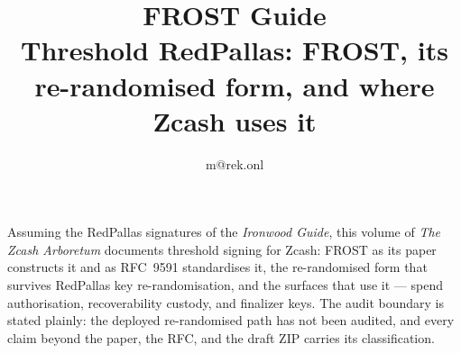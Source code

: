 \documentclass[11pt,a4paper]{article}
\title{\textbf{\Huge FROST Guide}\\[6pt]\large Threshold RedPallas: FROST, its re-randomised form, and where Zcash uses it}
\author{m@rek.onl}
\date{}
\theoremstyle{definition}
\renewenvironment{abstract}{%
  \small\begin{center}{\bfseries\abstractname}\end{center}\medskip\noindent\ignorespaces
}{\par\medskip}
\begin{document}
\maketitle
\thispagestyle{empty}
\begin{abstract}
Assuming the RedPallas signatures of the \emph{Ironwood Guide}, this volume
of \emph{The Zcash Arboretum} documents threshold signing for Zcash: FROST as
its paper constructs it and as RFC~9591 standardises it, the re-randomised
form that survives RedPallas key re-randomisation, and the surfaces that use
it --- spend authorisation, recoverability custody, and finalizer keys. The
audit boundary is stated plainly: the deployed re-randomised path has not been
audited, and every claim beyond the paper, the RFC, and the draft ZIP carries
its classification.
\end{abstract}
\clearpage
\tableofcontents
\clearpage
\end{document}
